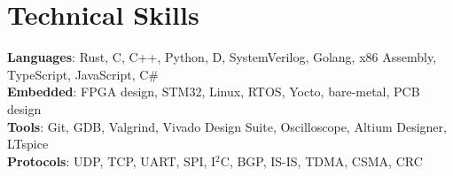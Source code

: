 \documentclass[letterpaper,11pt]{article}
\begin{document}
\section{Technical Skills}
 \begin{itemize}[leftmargin=0.15in, label={}]
    \small{\item{
     \textbf{Languages}{: Rust, C, C++, Python, D, SystemVerilog, Golang, x86 Assembly, TypeScript, JavaScript, C\#} \\
     \textbf{Embedded}{: FPGA design, STM32, Linux, RTOS, Yocto, bare-metal, PCB design} \\
     \textbf{Tools}{: Git, GDB, Valgrind, Vivado Design Suite, Oscilloscope, Altium Designer, LTspice} \\
     \textbf{Protocols}{: UDP, TCP, UART, SPI, I$^2$C, BGP, IS-IS, TDMA, CSMA, CRC} \\
    }}
 \end{itemize}
\end{document}
